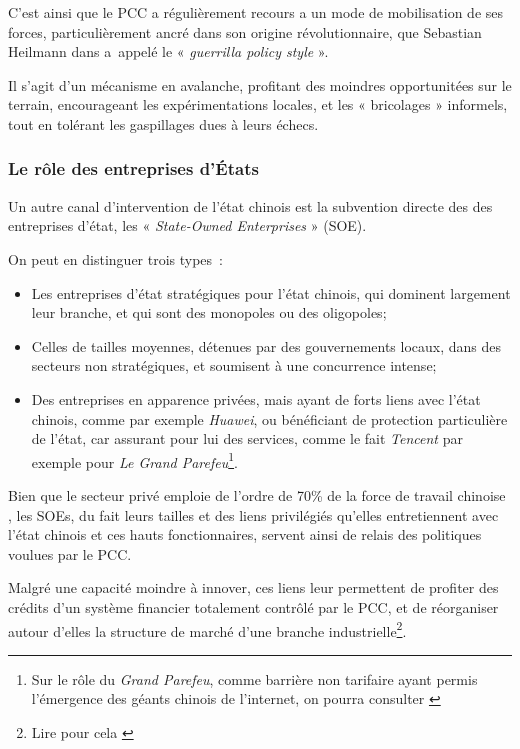 \documentclass[a4paper]{article}
\begin{document}
 C’est ainsi que le PCC a régulièrement recours a un mode de mobilisation de ses forces, particulièrement ancré dans son origine révolutionnaire, que Sebastian Heilmann dans \cite{heilmann18_red} a appelé le « \textit{guerrilla policy style} ».

Il s’agit d’un mécanisme en avalanche, profitant des moindres opportunitées sur le terrain, encourageant les expérimentations locales, et les « bricolages » informels, tout en tolérant les gaspillages dues à leurs échecs. 

\subsubsection{Le rôle des entreprises d’États}
\label{sec:org5c8608f}

Un autre canal d’intervention de l’état chinois est la subvention directe des des entreprises d’état, les « \textit{State-Owned Enterprises} » (SOE).  

On peut en distinguer trois types~:
\begin{itemize}
\item Les entreprises d’état stratégiques pour l’état chinois, qui dominent largement leur branche, et qui sont des monopoles ou des oligopoles;
\item Celles de tailles moyennes, détenues par des gouvernements locaux, dans des secteurs non stratégiques, et soumisent à une concurrence intense;
\item Des entreprises en apparence privées, mais ayant de forts liens avec l’état chinois, comme par exemple \textit{Huawei}, ou bénéficiant de protection particulière de l’état, car assurant pour lui des services, comme le fait \textit{Tencent} par exemple pour \textit{Le Grand Parefeu}\footnote{Sur le rôle du \textit{Grand Parefeu}, comme barrière non tarifaire ayant permis l’émergence des géants chinois de l’internet, on pourra consulter \cite{griffiths19_china}}.
\end{itemize}


Bien que le secteur privé emploie de l’ordre de 70\% de la force de travail chinoise \cite{xiaolan15_chinas}, les SOEs, du fait leurs tailles et des liens privilégiés qu’elles entretiennent avec l’état chinois et ces hauts fonctionnaires, servent ainsi de relais des politiques voulues par le PCC.

Malgré une capacité moindre à innover, ces liens leur permettent de profiter des crédits d’un système financier totalement contrôlé par le PCC, et de réorganiser autour d’elles la structure de marché d’une branche industrielle\footnote{Lire pour cela \cite{naughton21_rise}}.
\end{document}
